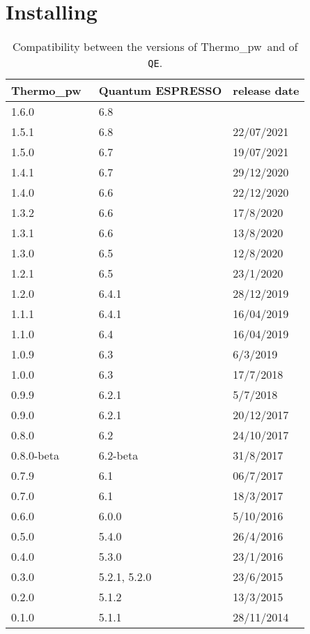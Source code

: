 \documentclass[12pt,a4paper,twoside]{report}
\def\qe{{\sc Quantum ESPRESSO}}
\def\thermo{{\sc Thermo\_pw}}
\begin{document}
{\color{coral}\section{Installing}}
\color{black}
\begin{table}
\begin{center}
\begin{tabular}{lll}
\hline
\hline
\thermo\ & \qe & release date \\
\hline
1.6.0 & 6.8 & \\
1.5.1 & 6.8 & 22/07/2021 \\
1.5.0 & 6.7 & 19/07/2021 \\
1.4.1 & 6.7 & 29/12/2020 \\
1.4.0 & 6.6 & 22/12/2020 \\
1.3.2 & 6.6 & 17/8/2020 \\
1.3.1 & 6.6 & 13/8/2020 \\
1.3.0 & 6.5 & 12/8/2020 \\
1.2.1 & 6.5 & 23/1/2020 \\
1.2.0 & 6.4.1 & 28/12/2019 \\
1.1.1 & 6.4.1 & 16/04/2019 \\
1.1.0 & 6.4 & 16/04/2019 \\
1.0.9 & 6.3 & 6/3/2019 \\
1.0.0 & 6.3 & 17/7/2018 \\
0.9.9 & 6.2.1 & 5/7/2018 \\
0.9.0 & 6.2.1 & 20/12/2017 \\
0.8.0 & 6.2 & 24/10/2017 \\
0.8.0-beta & 6.2-beta & 31/8/2017\\
0.7.9 & 6.1 & 06/7/2017 \\
0.7.0 & 6.1 & 18/3/2017 \\
0.6.0 & 6.0.0 & 5/10/2016 \\
0.5.0 & 5.4.0 & 26/4/2016 \\
0.4.0 & 5.3.0 & 23/1/2016 \\
0.3.0 & 5.2.1, 5.2.0 & 23/6/2015 \\
0.2.0 & 5.1.2 & 13/3/2015 \\
0.1.0 & 5.1.1 & 28/11/2014 \\
\hline
\hline
\end{tabular}
\caption{Compatibility between the versions of 
\thermo\ and of \texttt{QE}.}
\end{center}
\end{table}
\end{document}

